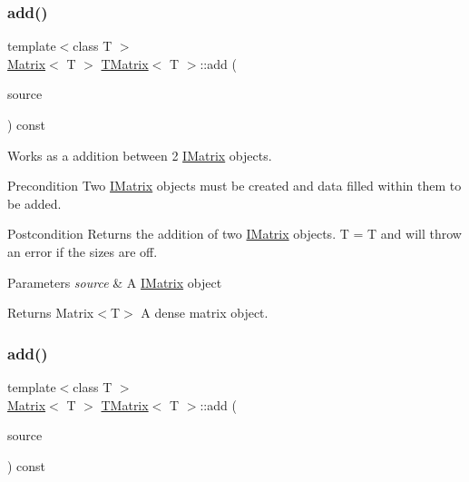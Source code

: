 \subsubsection{\texorpdfstring{add()}{add()}\hspace{0.1cm}{\footnotesize\ttfamily [4/6]}}
{\footnotesize\ttfamily template$<$class T $>$ \\
\mbox{\hyperlink{class_matrix}{Matrix}}$<$ T $>$ \mbox{\hyperlink{class_t_matrix}{T\+Matrix}}$<$ T $>$\+::add (\begin{DoxyParamCaption}\item[{const \mbox{\hyperlink{class_i_matrix}{I\+Matrix}}$<$ \mbox{\hyperlink{class_u_matrix}{U\+Matrix}}$<$ T $>$, T $>$ \&}]{source }\end{DoxyParamCaption}) const}



Works as a addition between 2 \mbox{\hyperlink{class_i_matrix}{I\+Matrix}} objects. 

\begin{DoxyPrecond}{Precondition}
Two \mbox{\hyperlink{class_i_matrix}{I\+Matrix}} objects must be created and data filled within them to be added. 
\end{DoxyPrecond}
\begin{DoxyPostcond}{Postcondition}
Returns the addition of two \mbox{\hyperlink{class_i_matrix}{I\+Matrix}} objects. T = T and will throw an error if the sizes are off.
\end{DoxyPostcond}

\begin{DoxyParams}{Parameters}
{\em source} & A \mbox{\hyperlink{class_i_matrix}{I\+Matrix}} object \\
\hline
\end{DoxyParams}
\begin{DoxyReturn}{Returns}
Matrix$<$\+T$>$ A dense matrix object. 
\end{DoxyReturn}
\mbox{\label{class_t_matrix_a0be28ad9f704a789707cb1240eda9263}} 
\subsubsection{\texorpdfstring{add()}{add()}\hspace{0.1cm}{\footnotesize\ttfamily [5/6]}}
{\footnotesize\ttfamily template$<$class T $>$ \\
\mbox{\hyperlink{class_matrix}{Matrix}}$<$ T $>$ \mbox{\hyperlink{class_t_matrix}{T\+Matrix}}$<$ T $>$\+::add (\begin{DoxyParamCaption}\item[{const \mbox{\hyperlink{class_i_matrix}{I\+Matrix}}$<$ \mbox{\hyperlink{class_s_matrix}{S\+Matrix}}$<$ T $>$, T $>$ \&}]{source }\end{DoxyParamCaption}) const}



